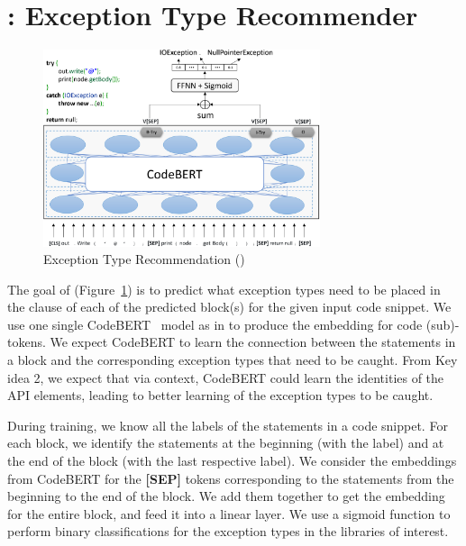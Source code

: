 \section{{\xtype}: Exception Type Recommender}
\label{sec:xtype}

\begin{figure}[t]
\begin{center}
\includegraphics[width=3.2in]{xtype-5.png}
\vspace{-8pt}
\caption{Exception Type Recommendation ({\xtype})}
\label{fig:xtype}
\end{center}
\end{figure}

The goal of {\xtype} (Figure~\ref{fig:xtype}) is to predict what
exception types need to be placed in the  clause of each
of the predicted  block(s) for the given input code
snippet. We use one single CodeBERT~\cite{codebert-emnlp20} model as
in {\xblock} to produce the embedding for code (sub)-tokens.
%
We expect CodeBERT to learn the connection between the statements in a
 block and the corresponding exception types that need
to be caught. From Key idea 2, we expect that via context, CodeBERT
could learn the identities of the API elements, leading to
better learning of the exception types to be caught.

During training, we know all the labels of the statements in a code
snippet. For each  block, we identify the statements
at the beginning (with the  label) and at the end of the
block (with the last respective  label).
We consider the embeddings from CodeBERT for the {\bf [SEP]}
tokens corresponding to the statements from the beginning to the end
of the block. We add them together to get the
embedding for the entire  block, and feed it into
a linear layer. We use a sigmoid function to perform binary
classifications for the exception types in the libraries of interest.


